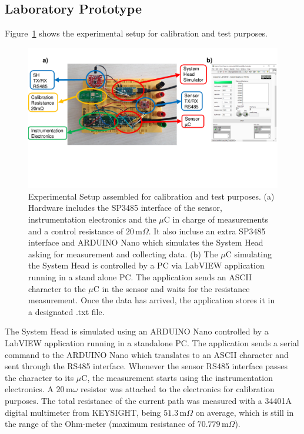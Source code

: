 \documentclass[journal,twoside,web]{ieeecolor}
\begin{document}
\subsection{Laboratory Prototype}
\label{ssec:labProto}
Figure~\ref{fig:measSet} shows the experimental setup for calibration and test purposes.
\begin{figure}
\centering
\includegraphics [trim = 0mm 50mm 0mm 0mm, clip, width=1\textwidth]{images/fig4.pdf}
\caption{Experimental Setup assembled for calibration and test purposes. (a) Hardware includes the SP3485 interface of the sensor, instrumentation electronics and the $\mu$C in charge of measurements and a control resistance of $20$\,m$\Omega$. It also incluse an extra SP3485 interface and ARDUINO Nano which simulates the System Head asking for measurement and collecting data. (b) The $\mu$C simulating the System Head is controlled by a PC via LabVIEW application running in a stand alone PC. The application sends an ASCII character to the $\mu$C in the sensor and waits for the resistance measurement. Once the data has arrived, the application stores it in a designated .txt file.}
\label{fig:measSet}
\end{figure}
The System Head is simulated using an ARDUINO Nano controlled by a LabVIEW application running in a standalone PC. The application sends a serial command to the ARDUINO Nano which translates to an ASCII character and sent through the RS485 interface. Whenever the sensor RS485 interface passes the character to its $\mu$C, the measurement starts using the instrumentation electronics. A $20$\,m$\omega$ resistor was attached to the electronics for calibration purposes. The total resistance of the current path was measured with a 34401A digital multimeter from KEYSIGHT, being $51.3$\,m$\Omega$ on average, which is still in the range of the Ohm-meter (maximum resistance of $70.779$\,m$\Omega$).
\end{document}

